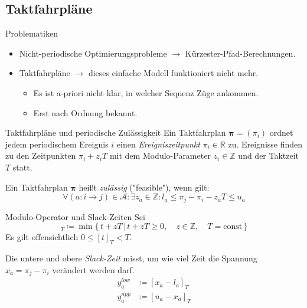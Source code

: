\documentclass[accentcolor = tud11b, colorbacktitle, landscape, german, presentation, tudmathserif]{tudbeamer}
\newcommand{\const}{\ensuremath{\textrm{const}}}
\newcommand{\R}{\ensuremath{\mathbb{R}}}
\newcommand{\Z}{\ensuremath{\mathbb{Z}}}
\renewcommand{\vec}[1]{\boldsymbol{\mathbf{#1}}}
\begin{document}
		\subsection{Taktfahrpläne}
			\begin{frame}{Problematiken}
				\begin{itemize}
					\item Nicht-periodische Optimierungsprobleme \(\to\) Kürzester-Pfad-Berechnungen.
					\item Taktfahrpläne \(\to\) dieses einfache Modell funktioniert nicht mehr.
						\begin{itemize}
							\item Es ist a-priori nicht klar, in welcher Sequenz Züge ankommen.
							\item Erst nach Ordnung bekannt.
						\end{itemize}
				\end{itemize}
			\end{frame}
		
			\begin{frame}{Taktfahrpläne und periodische Zulässigkeit}
				Ein Taktfahrplan \( \vec{\pi} = (\pi_i) \) ordnet jedem periodischem Ereignis \( i \) einen \emph{Ereigniszeitpunkt} \( \pi_i \in \R \) zu. Ereignisse finden zu den Zeitpunkten \( \pi_i + z_i T \) mit dem Modulo-Parameter \(z_i \in \Z\) und der Taktzeit \(T\) statt.
			
				\vspace{1cm}
				Ein Taktfahrplan \( \vec{\pi} \) heißt \emph{zulässig} ("feasible"), wenn gilt:
				\begin{equation*}
					\forall (a : i \to j) \in \mathcal{A} : \exists z_a \in \Z : l_a \leq \pi_j - \pi_i - z_a T \leq u_a
				\end{equation*}
			\end{frame}
		
			\begin{frame}{Modulo-Operator und Slack-Zeiten}
				Sei
				\begin{equation*}
					[t]_T \coloneqq \min \big\{\, t + zT \,\vert\, t + zT \geq 0, \quad z \in \Z, \quad T = \const \,\big\}
				\end{equation*}
				Es gilt offensichtlich \( 0 \leq [t]_T < T \).
			
				\vspace{1cm}
				Die untere und obere \emph{Slack-Zeit} misst, um wie viel Zeit die Spannung \( x_a = \pi_j - \pi_i \) verändert werden darf.
				\begin{align*}
					y_a^\mathit{low} &\coloneqq [x_a - l_a]_T \\
					y_a^\mathit{upp} &\coloneqq [u_a - x_a]_T
				\end{align*}
			\end{frame}
		
\end{document}
